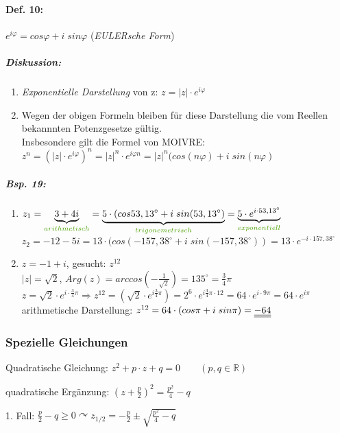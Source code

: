 \paragraph{Def. 10:} \parskp
$\boxed{e^{i\varphi}=cos\varphi+i\; sin \varphi}$ \qquad (\emph{EULERsche Form})
\subparagraph{Diskussion:}
\begin{enumerate}
\item \emph{Exponentielle Darstellung} von z: $\boxed{z=|z|\cdot e^{i\varphi}}$
\item Wegen der obigen Formeln bleiben für diese Darstellung die vom Reellen bekannnten Potenzgesetze gültig.\\
Insbesondere gilt die Formel von MOIVRE: \\
$\boxed{z^n=\left(|z|\cdot e^{i\varphi}\right)^n=|z|^n\cdot e^{i\varphi n}=|z|^n(cos(n\varphi)+i\; sin (n \varphi)}$
\end{enumerate}

\subparagraph{Bsp. 19:}
\begin{enumerate}
[label=\alph*.)]
\item $z_1=\underbrace{3+4i}_{\tgreen{arithmetisch}}=\underbrace{5\cdot (cos 53,13^{\circ}+i\; sin (53,13^{\circ})}_{\tgreen{trigonemetrisch}}=\underbrace{5\cdot e^{i\cdot 53,13^{\circ}}}_{\tgreen{exponentiell}}$\\
$z_2=-12-5i=13\cdot (cos(-157,38^{\circ}+i\; sin(-157,38^{\circ}))=13\cdot e^{-i\cdot 157,38^{\circ}}$
\item $z=-1+i$, gesucht: $z^{12}$\\
$|z|=\sqrt{2}$, $Arg(z)=arccos\left(-\frac{1}{\sqrt{2}}\right)=135^{\circ}=\frac{3}{4}\pi$\\
$z=\sqrt{2}\cdot e^{i\cdot \frac{3}{4}\pi}\Rightarrow z^12=\left(\sqrt{2}\cdot e^{i\frac{3}{4}\pi}\right)=2^6\cdot e^{i\frac{3}{4}\pi \cdot 12}=64 \cdot e ^{i\cdot 9 \pi}=64\cdot e^{i\pi}$\\
arithmetische Darstellung: $z^{12}=64\cdot (cos\pi+i\; sin\pi)=\underline{\underline{-64}}$
\end{enumerate}

\subsubsection{Spezielle Gleichungen}
Quadratische Gleichung: $z^2+p\cdot z+q=0 \qquad (p,q \in \mathbb{R})$

quadratische Ergänzung: $\left(z+\frac{p}{2}\right)^2=\frac{p^2}{4}-q$

1. Fall: $\frac{p}{2}-q \geq 0 \curvearrowright z_{1/2}=-\frac{p}{2}\pm \sqrt{\frac{p^2}{4}-q}$

